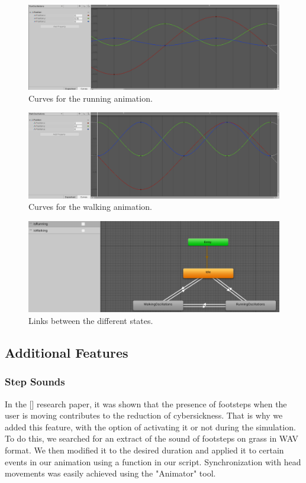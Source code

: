 \documentclass[american]{acmtog} %
\begin{document}
\begin{figure}[H]
\centerline{\includegraphics[width=\columnwidth]{figures/run_curves.png}}
\caption{Curves for the running animation.}
    \label{fig:run_curves}
\end{figure}

\begin{figure}[H]
\centerline{\includegraphics[width=\columnwidth]{figures/walk_curves.png}}
\caption{Curves for the walking animation.}
    \label{fig:walk_curves}
\end{figure}

\begin{figure}[H]
\centerline{\includegraphics[width=\columnwidth]{figures/animator.png}}
\caption{Links between the different states.}
    \label{fig:animator}
\end{figure}

\subsection{Additional Features}
\subsubsection{Step Sounds}
In the [\cite{walking_vibe}] research paper, it was shown that the presence of footsteps when the user is moving contributes to the reduction of cybersickness. That is why we added this feature, with the option of activating it or not during the simulation. To do this, we searched for an extract of the sound of footsteps on grass in WAV format. We then modified it to the desired duration and applied it to certain events in our animation using a function in our script. Synchronization with head movements was easily achieved using the "Animator" tool.
\end{document}
